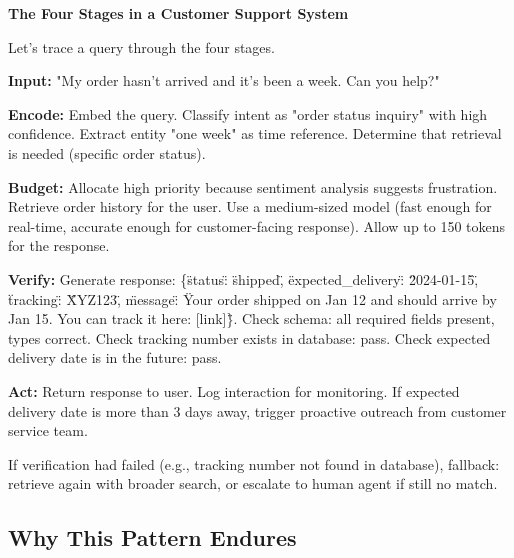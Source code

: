\begin{examplebox}
\textbf{The Four Stages in a Customer Support System}

\vspace{0.5em}

Let's trace a query through the four stages.

\vspace{0.5em}

\textbf{Input:} "My order hasn't arrived and it's been a week. Can you help?"

\vspace{0.5em}

\textbf{Encode:} Embed the query. Classify intent as "order status inquiry" with high confidence. Extract entity "one week" as time reference. Determine that retrieval is needed (specific order status).

\vspace{0.5em}

\textbf{Budget:} Allocate high priority because sentiment analysis suggests frustration. Retrieve order history for the user. Use a medium-sized model (fast enough for real-time, accurate enough for customer-facing response). Allow up to 150 tokens for the response.

\vspace{0.5em}

\textbf{Verify:} Generate response: \{\"status\": \"shipped\", \"expected\_delivery\": \"2024-01-15\", \"tracking\": \"XYZ123\", \"message\": \"Your order shipped on Jan 12 and should arrive by Jan 15. You can track it here: [link]\"\}. Check schema: all required fields present, types correct. Check tracking number exists in database: pass. Check expected delivery date is in the future: pass.

\vspace{0.5em}

\textbf{Act:} Return response to user. Log interaction for monitoring. If expected delivery date is more than 3 days away, trigger proactive outreach from customer service team.

\vspace{0.5em}

If verification had failed (e.g., tracking number not found in database), fallback: retrieve again with broader search, or escalate to human agent if still no match.
\end{examplebox}

\vspace{1.5em}

\subsection{Why This Pattern Endures}

